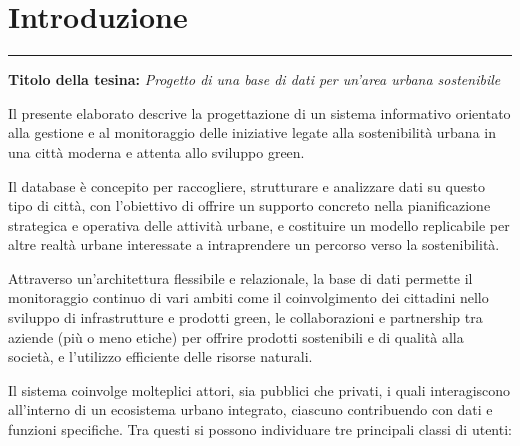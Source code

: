 \documentclass{article}
\begin{document}


\tableofcontents
\newpage


\section*{Introduzione}
\raggedright

\vspace{-0.5cm}
\noindent\rule{\textwidth}{1pt}
\vspace{0.5cm}

\textbf{Titolo della tesina:} \textit{Progetto di una base di dati per un'area urbana sostenibile}

\par\vspace{0.5cm}

Il presente elaborato descrive la progettazione di un sistema informativo orientato alla gestione e al monitoraggio delle iniziative legate alla sostenibilità urbana in una città moderna e attenta allo sviluppo green.

\par\vspace{0.3cm}

Il database è concepito per raccogliere, strutturare e analizzare dati su questo tipo di città, con l'obiettivo di offrire un supporto concreto nella pianificazione strategica e operativa delle attività urbane, e costituire un modello replicabile per altre realtà urbane interessate a intraprendere un percorso verso la sostenibilità.

\par\vspace{0.3cm}

Attraverso un'architettura flessibile e relazionale, la base di dati permette il monitoraggio continuo di vari ambiti come il coinvolgimento dei cittadini nello sviluppo di infrastrutture e prodotti green, le collaborazioni e partnership tra aziende (più o meno etiche) per offrire prodotti sostenibili e di qualità alla società, e l'utilizzo efficiente delle risorse naturali.

\par\vspace{0.3cm}

Il sistema coinvolge molteplici attori, sia pubblici che privati, i quali interagiscono all’interno di un ecosistema urbano integrato, ciascuno contribuendo con dati e funzioni specifiche. Tra questi si possono individuare tre principali classi di utenti:
\end{document}
